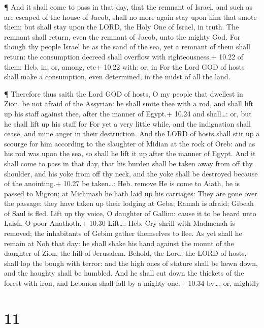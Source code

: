  ¶ And it shall come to pass in that day, that the remnant
of Israel, and such as are escaped of the house of Jacob, shall no more
again stay upon him that smote them; but shall stay upon the LORD, the
Holy One of Israel, in truth.  The remnant shall return,
even the remnant of Jacob, unto the mighty God.  For though
thy people Israel be as the sand of the sea, yet a remnant of them shall
return: the consumption decreed shall overflow with righteousness.+
10.22 of them: Heb. in, or, among, etc+ 10.22 with: or, in 
For the Lord GOD of hosts shall make a consumption, even determined, in
the midst of all the land.

 ¶ Therefore thus saith the Lord GOD of hosts, O my people
that dwellest in Zion, be not afraid of the Assyrian: he shall smite
thee with a rod, and shall lift up his staff against thee, after the
manner of Egypt.+ 10.24 and shall\ldots: or, but he shall lift up his
staff for  For yet a very little while, and the indignation
shall cease, and mine anger in their destruction.  And the
LORD of hosts shall stir up a scourge for him according to the slaughter
of Midian at the rock of Oreb: and as his rod was upon the sea, so shall
he lift it up after the manner of Egypt.  And it shall come
to pass in that day, that his burden shall be taken away from off thy
shoulder, and his yoke from off thy neck, and the yoke shall be
destroyed because of the anointing.+ 10.27 be taken\ldots: Heb. remove
 He is come to Aiath, he is passed to Migron; at Michmash
he hath laid up his carriages:  They are gone over the
passage: they have taken up their lodging at Geba; Ramah is afraid;
Gibeah of Saul is fled.  Lift up thy voice, O daughter of
Gallim: cause it to be heard unto Laish, O poor Anathoth.+ 10.30
Lift\ldots: Heb. Cry shrill with  Madmenah is removed; the
inhabitants of Gebim gather themselves to flee.  As yet
shall he remain at Nob that day: he shall shake his hand against the
mount of the daughter of Zion, the hill of Jerusalem. 
Behold, the Lord, the LORD of hosts, shall lop the bough with terror:
and the high ones of stature shall be hewn down, and the haughty shall
be humbled.  And he shall cut down the thickets of the
forest with iron, and Lebanon shall fall by a mighty one.+ 10.34
by\ldots: or, mightily

\hypertarget{section-10}{%
\section{11}\label{section-10}}

